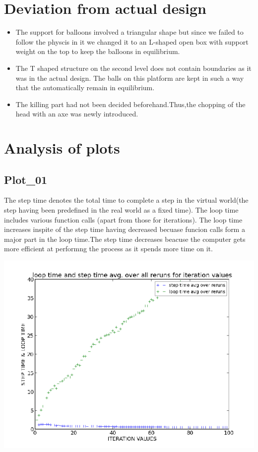 \documentclass[11pt]{article}
\begin{document}
\section{Deviation from actual design}

\begin{itemize}
\item The support for balloons involved a triangular shape but since we failed to follow the physcis in it we changed it to an L-shaped open box with support weight on the top to keep the balloons in equilibrium.
\item The T shaped structure on the second level does not contain boundaries as it was in the actual design. The balls on this platform are kept in such a way that the automatically remain in equilibrium.
\item The killing part had not been decided beforehand.Thus,the chopping of the head with an axe was newly introduced.
\end{itemize}

\section{Analysis of plots}

\subsection{Plot\_01}
The step time denotes the total time to complete a step in the virtual world(the step having been predefined in the real world as a fixed time).
The loop time includes various function calls (apart from those for iterations). The loop time increases inspite of the step time having decreased
becuase funcion calls form a major part in the loop time.The step time decreases beacuse the computer gets more efficient at performng the process
as it spends more time on it. 

    \begin{center}
   \includegraphics[scale=0.55]{images/g18_plot01.png}
    \end{center}
	
\end{document}
